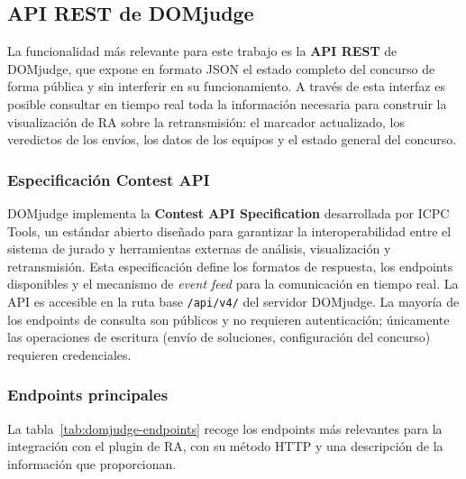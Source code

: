 \subsection{API REST de DOMjudge}
\label{subsec:domjudge_api}

La funcionalidad más relevante para este trabajo es la \textbf{API REST} de DOMjudge, que expone en formato JSON el estado completo del concurso de forma pública y sin interferir en su funcionamiento. A través de esta interfaz es posible consultar en tiempo real toda la información necesaria para construir la visualización de RA sobre la retransmisión: el marcador actualizado, los veredictos de los envíos, los datos de los equipos y el estado general del concurso.

\subsubsection*{Especificación Contest API}

DOMjudge implementa la \textbf{Contest API Specification} desarrollada por ICPC Tools, un estándar abierto diseñado para garantizar la interoperabilidad entre el sistema de jurado y herramientas externas de análisis, visualización y retransmisión. Esta especificación define los formatos de respuesta, los endpoints disponibles y el mecanismo de \textit{event feed} para la comunicación en tiempo real. La API es accesible en la ruta base \texttt{/api/v4/} del servidor DOMjudge. La mayoría de los endpoints de consulta son públicos y no requieren autenticación; únicamente las operaciones de escritura (envío de soluciones, configuración del concurso) requieren credenciales.

\subsubsection*{Endpoints principales}

La tabla~\ref{tab:domjudge-endpoints} recoge los endpoints más relevantes para la integración con el plugin de RA, con su método HTTP y una descripción de la información que proporcionan.

